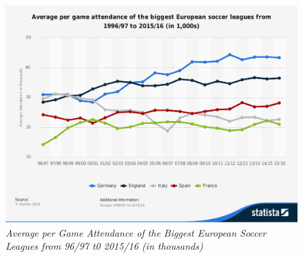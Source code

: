 \documentclass[inte,nonblindrev]{informs3} %
\begin{document}
\begin{figure}[!ht]
\centering\includegraphics[width=1.0\textwidth]{Figure2.pdf}
\caption{\textit{Average per Game Attendance of the Biggest European Soccer Leagues from 96/97 t0 2015/16 (in thousands) }}
\end{figure}
\end{document}

